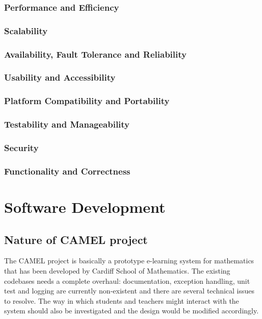 \documentclass[a4paper, 12pt, titlepage]{article}
\begin{document}
\subsubsection*{Performance and Efficiency} 

\subsubsection*{Scalability} 

\subsubsection*{Availability, Fault Tolerance and Reliability} 

\subsubsection*{Usability and Accessibility} 

\subsubsection*{Platform Compatibility and Portability} 

\subsubsection*{Testability and Manageability} 

\subsubsection*{Security} 

\subsubsection*{Functionality and Correctness} 



\section{Software Development}

\subsection*{Nature of CAMEL project}
The CAMEL project is basically a prototype e-learning system for mathematics that has been developed by Cardiff School of Mathematics. The existing codebases needs a complete overhaul: documentation, exception handling, unit test and logging are currently non-existent and there are several technical issues to resolve. The way in which students and teachers might interact with the system should also be investigated and the design would be modified accordingly.
 
\end{document}

